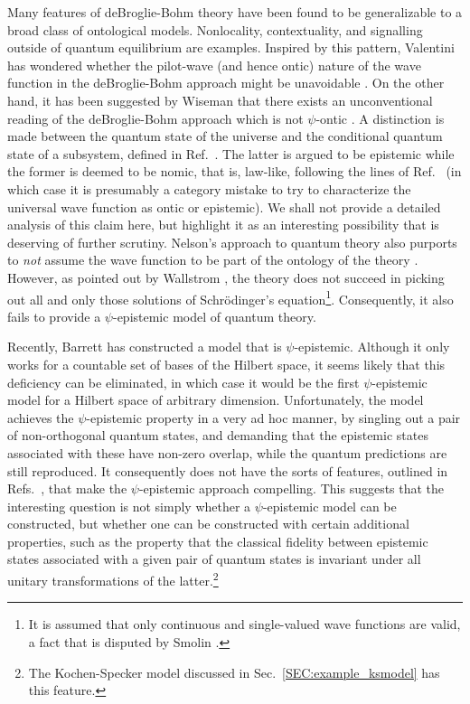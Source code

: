 \documentclass[aps,nofootinbib,12pt]{revtex4-2}
\begin{document}
Many features of deBroglie-Bohm theory have been found to be
generalizable to a broad class of ontological models. Nonlocality,
contextuality, and signalling outside of quantum equilibrium
\cite{valentini} are examples. Inspired by this pattern, Valentini
has wondered whether the pilot-wave (and hence ontic) nature of the
wave function in the deBroglie-Bohm approach might be unavoidable
\cite{Valentiniprivate}. On the other hand, it has been suggested by
Wiseman that there exists an unconventional reading of the
deBroglie-Bohm approach which is not $\psi$-ontic
\cite{Wisemanprivate}. A distinction is made between the quantum
state of the universe and the conditional quantum state of a
subsystem, defined in Ref.~\cite{DGZ_conditionalqstate}. The latter
is argued to be epistemic while the former is deemed to be nomic,
that is, law-like, following the lines of
Ref.~\cite{DurrGoldteinZanghi} (in which case it is presumably a
category mistake to try to characterize the universal wave function
as ontic or epistemic). We shall not provide a detailed analysis of
this claim here, but highlight it as an interesting possibility that
is deserving of further scrutiny. Nelson's approach to quantum
theory \cite{Nelsonbook} also purports to \textit{not} assume the
wave function to be part of the ontology of the theory
\cite{BacconNelson}. However, as pointed out by Wallstrom
\cite{Wallstrom}, the theory does not succeed in picking out all and
only those solutions of Schr\"{o}dinger's equation\footnote{It is
assumed that only continuous and single-valued wave functions are
valid, a fact that is disputed by Smolin \cite{Smolin_Nelson}.}.
Consequently, it also fails to provide a $\psi$-epistemic model of
quantum theory.

Recently, Barrett \cite{Barrettpc} has constructed a model that is
$\psi$-epistemic.  Although it only works for a countable set of
bases of the Hilbert space, it seems likely that this deficiency can
be eliminated, in which case it would be the first $\psi$-epistemic
model for a Hilbert space of arbitrary dimension. Unfortunately, the
model achieves the $\psi$-epistemic property in a very ad hoc
manner, by singling out a pair of non-orthogonal quantum states, and
demanding that the epistemic states associated with these have
non-zero overlap, while the quantum predictions are still
reproduced.  It consequently does not have the sorts of features,
outlined in Refs.~\cite{toy_theory,BRSLiouville}, that make the
$\psi$-epistemic approach compelling.  This suggests that the
interesting question is not simply whether a $\psi$-epistemic model
can be constructed, but whether one can be constructed with certain
additional properties, such as the property that the classical
fidelity between epistemic states associated with a given pair of
quantum states is invariant under all unitary transformations of the
latter.\footnote{The Kochen-Specker model discussed in
Sec.~\ref{SEC:example_ksmodel} has this feature.}
\end{document}
